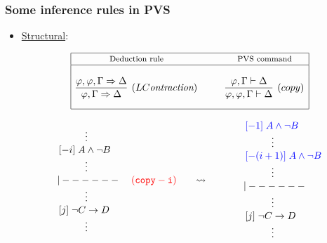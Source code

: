 \documentclass[10pt]{beamer}
\begin{document}
\begin{frame}
\frametitle{Some inference rules in PVS}

 	\begin{itemize}
		\item \underline{{\color{blue}Structural}}:
{\scriptsize
\begin{table}
\vspace{-7mm}
\[\begin{array}{|c@{\hspace{1cm}}c|}
\hline
\mbox{\footnotesize Deduction rule} & \mbox{\footnotesize PVS command} \\
\hline
&\\
\infer[(LC\mbox{\it ontraction})]{\varphi,\Gamma\Rightarrow\Delta}{\varphi,\varphi,\Gamma\Rightarrow\Delta} & 
\infer[(copy)]{\varphi,\varphi,\Gamma\vdash\Delta}{\varphi,\Gamma\vdash\Delta}\\[3mm]
\hline
\end{array}\]
\end{table}
}

{\footnotesize
\[\begin{array}{l}
     \hspace{10mm}\vdots\\
     \,[-i]\; A \wedge \neg B \\
     \hspace{10mm}\vdots\\
     {\small{\tt{|------}}} \\
     \hspace{10mm} \vdots\\
     \,[j]\;  \neg C\rightarrow D \\
     \hspace{10mm} \vdots\\
   \end{array}         
   \hspace{1mm}
   \begin{array}{c}{\color{red}{\tt (copy -i)}} \hspace{6mm}\rightsquigarrow\end{array}
   \hspace{10mm}
   \begin{array}{l}
     \,{\color{blue}[-1]\; A \wedge \neg B} \\
     \hspace{10mm}\vdots\\
     \,{\color{blue}[-(i+1)]\; A \wedge \neg B} \\
     \hspace{10mm}\vdots\\
    {\small{\tt{|------}}} \\
     \hspace{10mm} \vdots\\
     \,[j]\;  \neg C\rightarrow D \\
     \hspace{10mm} \vdots\\
   \end{array}  \]
}


\end{itemize}
\end{frame}
\end{document}
